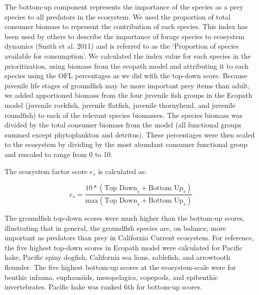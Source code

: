 \documentclass[11pt,
  english,
  a4paper,
]{article}
\begin{document}
The bottom-up component represents the importance of the species as a prey species to all predators in the ecosystem. We used the proportion of total consumer biomass to represent the contribution of each species. This index has been used by others to describe the importance of forage species to ecosystem dynamics {(Smith et al. 2011)\leavevmode\tagmcend\tagstructend} and is referred to as the `Proportion of species available for consumption'. We calculated the index value for each species in the prioritization, using biomass from the ecopath model and attributing it to each species using the OFL percentages as we did with the top-down score. Because juvenile life stages of groundfish may be more important prey items than adult, we added apportioned biomass from the four juvenile fish groups in the Ecopath model (juvenile rockfish, juvenile flatfish, juvenile thornyhead, and juvenile roundfish) to each of the relevant species biomasses. The species biomass was divided by the total consumer biomass from the model (all functional groups summed except phytoplankton and detritus). These percentages were then scaled to the ecosystem by dividing by the most abundant consumer functional group and rescaled to range from 0 to 10.

\leavevmode\tagmcend\tagstructend\par


The ecosystem factor score {\(e_s\)\leavevmode\tagmcend\tagstructend} is calculated as:

\leavevmode\tagmcend\tagstructend\par


{\[
e_s = \frac{10*(\text{Top Down}_s + \text{Bottom Up}_s)}{\text{max}(\text{Top Down}_s + \text{Bottom Up}_s)}
\]\leavevmode\tagmcend\tagstructend}

\leavevmode\tagmcend\tagstructend\par


The groundfish top-down scores were much higher than the bottom-up scores, illustrating that in general, the groundfish species are, on balance, more important as predators than prey in California Current ecosystem. For reference, the five highest top-down scores in Ecopath model were calculated for Pacific hake, Pacific spiny dogfish, California sea lions, sablefish, and arrowtooth flounder. The five highest bottom-up scores at the ecosystem-scale were for benthic infauna, euphausiids, mesopelagics, copepods, and epibenthic invertebrates. Pacific hake was ranked 6th for bottom-up scores.
\end{document}
